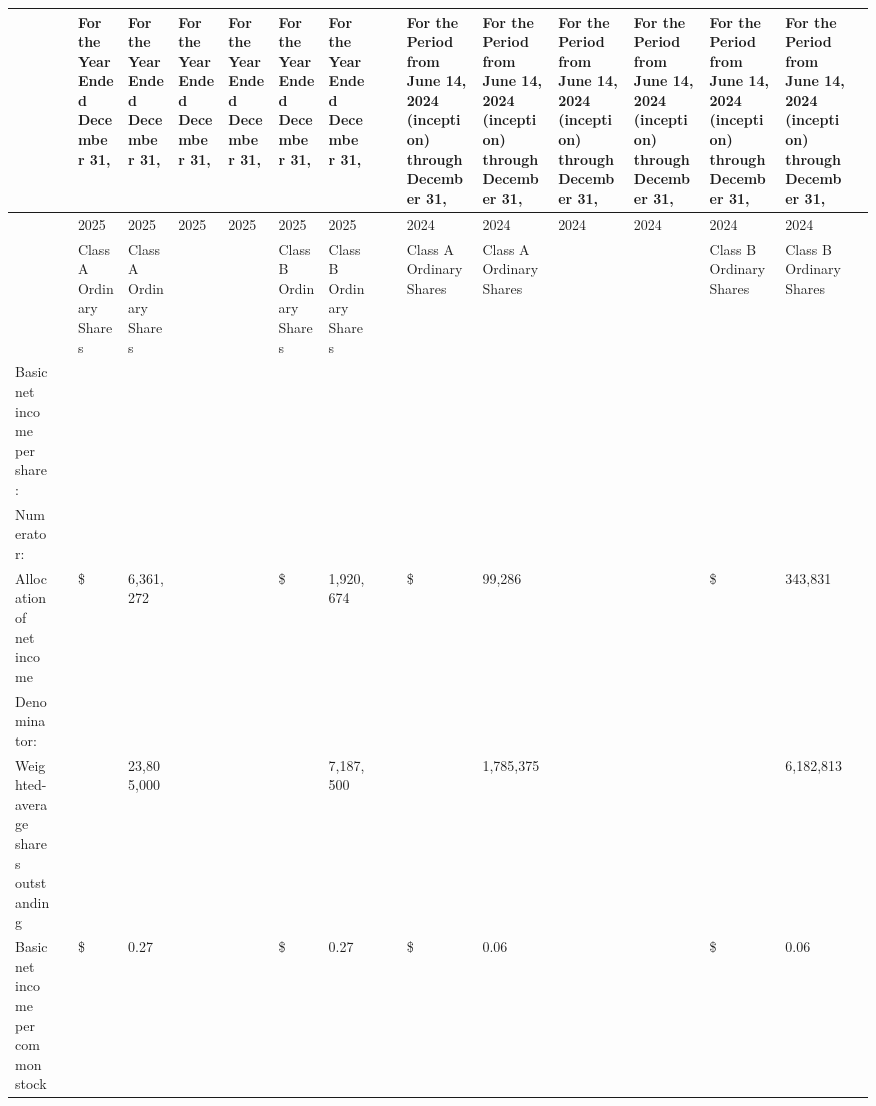 \documentclass[11pt,a4paper]{article}
\begin{document}
\begin{table}[h]
\begin{tabular}{|l|l|l|l|l|l|l|l|l|l|l|l|l|l|l|l|l|}
\hline
 &  & For the Year Ended December 31, & For the Year Ended December 31, & For the Year Ended December 31, & For the Year Ended December 31, & For the Year Ended December 31, & For the Year Ended December 31, &  &  & For the Period from June 14, 2024 (inception) through December 31, & For the Period from June 14, 2024 (inception) through December 31, & For the Period from June 14, 2024 (inception) through December 31, & For the Period from June 14, 2024 (inception) through December 31, & For the Period from June 14, 2024 (inception) through December 31, & For the Period from June 14, 2024 (inception) through December 31, &  \\ \hline
 &  & 2025 & 2025 & 2025 & 2025 & 2025 & 2025 &  &  & 2024 & 2024 & 2024 & 2024 & 2024 & 2024 &  \\ \hline
 &  & Class A Ordinary Shares & Class A Ordinary Shares &  &  & Class B Ordinary Shares & Class B Ordinary Shares &  &  & Class A Ordinary Shares & Class A Ordinary Shares &  &  & Class B Ordinary Shares & Class B Ordinary Shares &  \\ \hline
Basic net income per share: &  &  &  &  &  &  &  &  &  &  &  &  &  &  &  &  \\ \hline
Numerator: &  &  &  &  &  &  &  &  &  &  &  &  &  &  &  &  \\ \hline
Allocation of net income &  & \$ & 6,361,272 &  &  & \$ & 1,920,674 &  &  & \$ & 99,286 &  &  & \$ & 343,831 &  \\ \hline
Denominator: &  &  &  &  &  &  &  &  &  &  &  &  &  &  &  &  \\ \hline
Weighted-average shares outstanding &  &  & 23,805,000 &  &  &  & 7,187,500 &  &  &  & 1,785,375 &  &  &  & 6,182,813 &  \\ \hline
Basic net income per common stock &  & \$ & 0.27 &  &  & \$ & 0.27 &  &  & \$ & 0.06 &  &  & \$ & 0.06 &  \\ \hline
\end{tabular}
\end{table}
\end{document}
